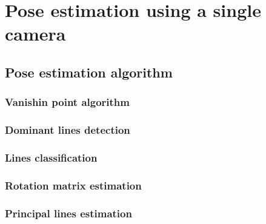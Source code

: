 \chapter{Pose estimation using a single camera}%

\ifpdf
    \graphicspath{{Chapter3/Figs/Raster/}{Chapter3/Figs/PDF/}{Chapter3/Figs/}}
\else
    \graphicspath{{Chapter3/Figs/Vector/}{Chapter3/Figs/}}
\fi
%
%
\section{Pose estimation algorithm}

\subsection{Vanishin point algorithm}
\subsection{Dominant lines detection}
\subsection{Lines classification}
\subsection{Rotation matrix estimation}
\subsection{Principal lines estimation}
